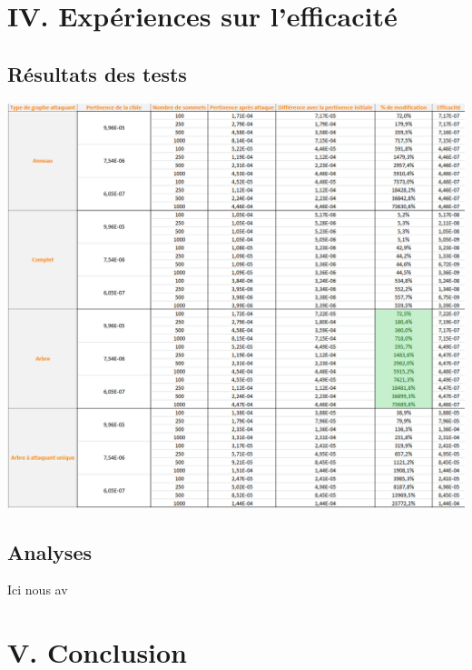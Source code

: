 \documentclass[a4paper,11pt]{article}
\begin{document}
\section{IV.	Expériences sur l'efficacité}
	\subsection{Résultats des tests}
		\includegraphics[scale = 0.6]{Captures/ranking5.PNG}\\
	\subsection{Analyses}
		Ici nous av
	
\section{V.		Conclusion}
\end{document}
